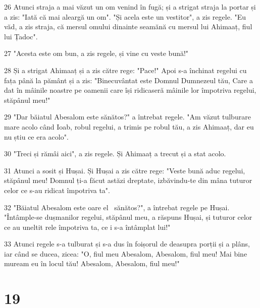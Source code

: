 \par 26 Atunci straja a mai văzut un om venind în fugă; și a strigat straja la portar și a zis: "Iată că mai aleargă un om". "Și acela este un vestitor", a zis regele. "Eu văd, a zis straja, că mersul omului dinainte seamănă cu mersul lui Ahimaaț, fiul lui Țadoc".
\par 27 "Acesta este om bun, a zis regele, și vine cu veste bună!"
\par 28 Și a strigat Ahimaaț și a zis către rege: "Pace!" Apoi s-a închinat regelui cu fața până la pământ și a zis: "Binecuvântat este Domnul Dumnezeul tău, Care a dat în mâinile noastre pe oamenii care își ridicaseră mâinile lor împotriva regelui, stăpânul meu!"
\par 29 "Dar băiatul Abesalom este sănătos?" a întrebat regele. "Am văzut tulburare mare acolo când Ioab, robul regelui, a trimis pe robul tău, a zis Ahimaaț, dar eu nu știu ce era acolo".
\par 30 "Treci și rămâi aici", a zis regele. Și Ahimaaț a trecut și a stat acolo.
\par 31 Atunci a sosit și Hușai. Și Hușai a zis către rege: "Veste bună aduc regelui, stăpânul meu! Domnul ți-a făcut astăzi dreptate, izbăvindu-te din mâna tuturor celor ce s-au ridicat împotriva ta".
\par 32 "Băiatul Abesalom este oare el  sănătos?", a întrebat regele pe Hușai. "Întâmple-se dușmanilor regelui, stăpânul meu, a răspuns Hușai, și tuturor celor ce au uneltit rele împotriva ta, ce i s-a întâmplat lui!"
\par 33 Atunci regele s-a tulburat și s-a dus în foișorul de deasupra porții și a plâns, iar când se ducea, zicea: "O, fiul meu Abesalom, Abesalom, fiul meu! Mai bine muream eu în locul tău! Abesalom, Abesalom, fiul meu!"

\chapter{19}

